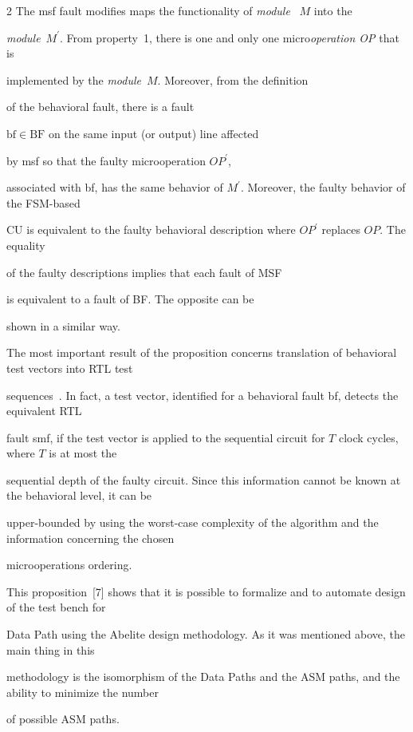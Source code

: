 \begin{multicols}{2}
   The msf fault modifies maps the functionality of \textit{module }~$M$ into the


\textit{module}~$M^\prime$. From property~1, there is one and only one micro\textit{operation OP} that is


implemented by the \textit{module}~$M$. Moreover, from the definition


of the behavioral fault, there is a fault


$\mathrm{bf} \in \mathrm{BF}$ on the same input (or output) line affected


by msf so that the faulty microoperation $OP^\prime$,


associated with bf, has the same behavior of $M^\prime$. Moreover, the faulty behavior of the FSM-based


CU is equivalent to the faulty behavioral description where $OP^\prime$ replaces $OP$. The equality


of the faulty descriptions implies that each fault of MSF


is equivalent to a fault of BF. The opposite can be


shown in a similar way.





   The most important result of the proposition concerns translation of behavioral test vectors into RTL test


sequences~\cite{7bar}. In fact, a test vector, identified for a behavioral fault bf, detects the equivalent RTL


fault smf, if the test vector is applied to the sequential circuit for $T$ clock cycles, where $T$ is at most the


sequential depth of the faulty circuit. Since this information cannot be known at the behavioral level, it can be


upper-bounded by using the worst-case complexity of the algorithm and the information concerning the chosen


microoperations ordering.





   This proposition~[7] shows that it is possible to formalize and to automate design of the test bench for


Data Path using the Abelite design methodology. As it was mentioned above, the main thing in this


methodology is the isomorphism of the Data Paths and the ASM paths, and the ability to minimize the number


of possible ASM paths.








   


\end{multicols}





